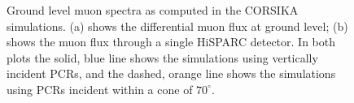 
\begin{figure}[ht!]
	\centering
	\qquad
	\caption{Ground level muon spectra as computed in the CORSIKA simulations. (a) shows the differential muon flux at ground level; (b) shows the muon flux through a single HiSPARC detector. In both plots the solid, blue line shows the simulations using vertically incident PCRs, and the dashed, orange line shows the simulations using PCRs incident within a cone of $70^{\circ}$.}
	\label{fig:CORSIKA_muon_spectra}
\end{figure}




